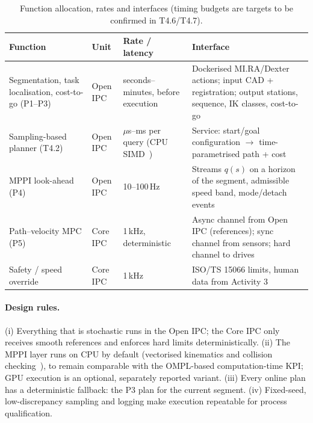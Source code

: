 \documentclass[10pt,a4paper]{article}
\begin{document}
\begin{table}[t]
\centering\small
\caption{Function allocation, rates and interfaces (timing budgets are targets to be confirmed in T4.6/T4.7).}\label{tab:alloc}
\begin{tabularx}{\textwidth}{@{}L{3.6cm}L{1.5cm}L{2.4cm}Y@{}}
\toprule
\textbf{Function} & \textbf{Unit} & \textbf{Rate / latency} & \textbf{Interface} \\
\midrule
Segmentation, task localisation, cost-to-go (P1--P3) & Open IPC & seconds--minutes, before execution & Dockerised MI.RA/Dexter actions; input CAD + registration; output stations, sequence, IK classes, cost-to-go \\
Sampling-based planner (T4.2) & Open IPC & $\mu$s--ms per query (CPU SIMD~\cite{thomason2024vamp}) & Service: start/goal configuration $\to$ time-parametrised path + cost \\
MPPI look-ahead (P4) & Open IPC & 10--100\,Hz & Streams $q(s)$ on a horizon of the segment, admissible speed band, mode/detach events \\
Path--velocity MPC (P5) & Core IPC & 1\,kHz, deterministic & Async channel from Open IPC (references); sync channel from sensors; hard channel to drives~\cite{faulwasser2017pathfollowing} \\
Safety / speed override & Core IPC & 1\,kHz & ISO/TS 15066 limits, human data from Activity 3~\cite{faroni2022safetyaware} \\
\bottomrule
\end{tabularx}
\end{table}

\paragraph{Design rules.} (i) Everything that is stochastic runs in the Open IPC; the Core IPC only receives smooth references and enforces hard limits deterministically. (ii) The MPPI layer runs on CPU by default (vectorised kinematics and collision checking~\cite{thomason2024vamp}), to remain comparable with the OMPL-based computation-time KPI; GPU execution is an optional, separately reported variant. (iii) Every online plan has a deterministic fallback: the P3 plan for the current segment. (iv) Fixed-seed, low-discrepancy sampling and logging make execution repeatable for process qualification.

\end{document}
